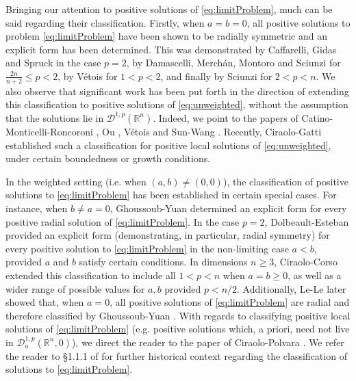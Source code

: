 \documentclass[10pt, reqno]{amsart}
\newcommand{\RR}{\mathbb{R}}
\newcommand{\D}{\mathcal{D}}
\numberwithin{equation}{section}
\theoremstyle{definition}
\theoremstyle{remark}
\theoremstyle{plain}
\begin{document}
	Bringing our attention to positive solutions of \eqref{eq:limitProblem}, much can be said regarding their classification. Firstly, when $a=b=0$, all positive solutions to problem \eqref{eq:limitProblem} have been shown to be radially symmetric and an explicit form has been determined. This was demonstrated by Caffarelli, Gidas and Spruck \cite{CaffarelliGidasSpruck} in the case $p=2$,  by Damascelli, Merch\'an, Montoro and Sciunzi \cite{damascellimerchanmontorosciunzi} for $\frac{2n}{n+2}\le p < 2$, by V\'etois \cite{vetois2016} for $1<p<2$, and finally by Sciunzi \cite{SCIUNZI201612} for $2 < p < n$. We also observe that significant work has been put forth in the direction of extending this classification to positive solutions of \eqref{eq:unweighted}, without the assumption that the solutions lie in $\D^{1,p}(\RR^n)$. Indeed, we point to the papers of Catino-Monticelli-Roncoroni \cite{catinoMonticelliRoncorini}, Ou \cite{ou2025classification}, V\'etois \cite{vetois2024note} and Sun-Wang \cite{sun2025criticalquasilinearequationsriemannian}. Recently, Ciraolo-Gatti \cite{ciraolo2025classificationresultsboundedpositive} established such a classification for positive local solutions of \eqref{eq:unweighted}, under certain boundedness or growth conditions.
	
	In the weighted setting (i.e. when $(a,b) \ne (0,0)$), the classification of positive solutions to \eqref{eq:limitProblem} has been established in certain special cases. For instance, when $b \ne a = 0$,  Ghoussoub-Yuan \cite{ghoussoub-yuan} determined an explicit form for  every positive radial solution of \eqref{eq:limitProblem}. In the case $p=2$, Dolbeault-Esteban \cite{DolbeaultEsteban} provided an explicit form (demonstrating, in particular, radial symmetry) for every positive solution to \eqref{eq:limitProblem} in the non-limiting case $a<b$, provided $a$ and $b$ satisfy certain conditions. In dimensions $n\ge 3$, Ciraolo-Corso \cite{ciraolo-corso} extended this classification  to include all $1<p<n$ when $a=b \ge 0$, as well as a wider range of possible values for $a,b$ provided $p<n/2$.  Additionally, Le-Le \cite{LeLe} later showed that, when $a=0$, all positive solutions of \eqref{eq:limitProblem} are radial and therefore classified by Ghoussoub-Yuan \cite{ghoussoub-yuan}.  With regards to classifying positive local solutions of \eqref{eq:limitProblem} (e.g. positive solutions which, a priori, need not live in $\D_a^{1,p}(\RR^n,0)$), we direct the reader to the paper of Ciraolo-Polvara \cite{ciraoloPolvara}. We refer the reader to \S1.1.1 of \cite{Chernysh} for further historical context regarding the classification of solutions to \eqref{eq:limitProblem}.\newline
	
\end{document}
